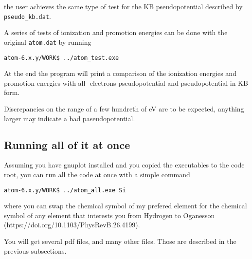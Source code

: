 \documentclass[11pt]{article}
\begin{document}
the user achieves the same type of test for the KB pseudopotential described by \texttt{pseudo{\_}kb.dat}.

A series of tests of ionization and promotion energies can be done with the original \texttt{atom.dat}
by running

\noindent\texttt{atom-6.x.y/WORK\$ ../atom{\_}test.exe} 

At the end the program will print a comparison of the ionization energies and promotion energies
with all- electrons pseudopotential and pseudopotential in KB form.

Discrepancies on the range of a few hundreth of eV are to be expected, anything larger
may indicate a bad paseudopotential.


\subsection{Running all of it at once}
\label{sec:run-all}

Assuming you have gnuplot installed and you copied the executables to the code root, you can run 
all the code at once with a simple command

\noindent\texttt{atom-6.x.y/WORK\$ ../atom{\_}all.exe Si}

where you can swap the chemical symbol of my prefered element for the chemical symbol of any element
that interests you from Hydrogen to Oganesson (https://doi.org/10.1103/PhysRevB.26.4199).

You will get several pdf files, and many other files.  Those are described in the previous subsections.
\end{document}
